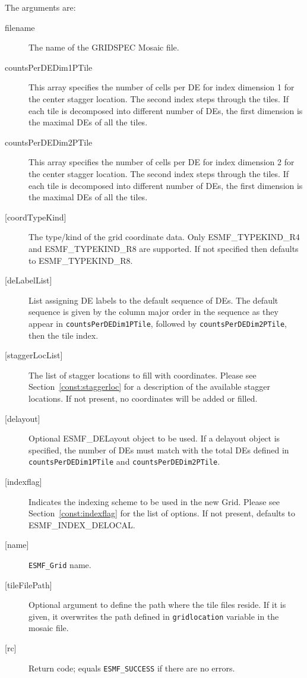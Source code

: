   
       The arguments are:
       \begin{description}
       \item[filename]
            The name of the GRIDSPEC Mosaic file.
       \item[countsPerDEDim1PTile]
            This array specifies the number of cells per DE for index dimension 1 for the
            center stagger location. The second index steps through the tiles. If each tile is 
            decomposed into different number of DEs, the first dimension is the maximal DEs of 
            all the tiles.  
       \item[countsPerDEDim2PTile]
            This array specifies the number of cells per DE for index dimension 2 for the
            center stagger location. The second index steps through the tiles. If each tile is 
            decomposed into different number of DEs, the first dimension is the maximal DEs of 
            all the tiles.  
       \item[{[coordTypeKind]}]
            The type/kind of the grid coordinate data. Only ESMF\_TYPEKIND\_R4
            and ESMF\_TYPEKIND\_R8 are supported.
            If not specified then defaults to ESMF\_TYPEKIND\_R8.
       \item[{[deLabelList]}]
            List assigning DE labels to the default sequence of DEs. The default
            sequence is given by the column major order in the sequence as they appear
            in {\tt countsPerDEDim1PTile}, followed by {\tt countsPerDEDim2PTile}, then the 
            tile index.
       \item[{[staggerLocList]}]
            The list of stagger locations to fill with coordinates. Please see Section~\ref{const:staggerloc}
            for a description of the available stagger locations. If not present, no coordinates
            will be added or filled.
       \item[{[delayout]}]
            Optional ESMF\_DELayout object to be used. If a delayout object is specified,
            the number of DEs must match with the total DEs defined in {\tt countsPerDEDim1PTile}
            and {\tt countsPerDEDim2PTile}.
       \item[{[indexflag]}]
            Indicates the indexing scheme to be used in the new Grid. Please see
            Section~\ref{const:indexflag} for the list of options. If not present,
            defaults to ESMF\_INDEX\_DELOCAL.
       \item[{[name]}]
            {\tt ESMF\_Grid} name.
       \item[{[tileFilePath]}]
            Optional argument to define the path where the tile files reside. If it
            is given, it overwrites the path defined in {\tt gridlocation} variable
            in the mosaic file.
       \item[{[rc]}]
            Return code; equals {\tt ESMF\_SUCCESS} if there are no errors.
       \end{description}
   
